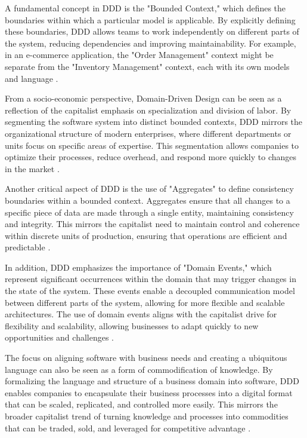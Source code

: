 \begin{refsection}
A fundamental concept in DDD is the "Bounded Context," which defines the boundaries within which a particular model is applicable. By explicitly defining these boundaries, DDD allows teams to work independently on different parts of the system, reducing dependencies and improving maintainability. For example, in an e-commerce application, the "Order Management" context might be separate from the "Inventory Management" context, each with its own models and language \cite[pp.~45-47]{Evans2004}.

From a socio-economic perspective, Domain-Driven Design can be seen as a reflection of the capitalist emphasis on specialization and division of labor. By segmenting the software system into distinct bounded contexts, DDD mirrors the organizational structure of modern enterprises, where different departments or units focus on specific areas of expertise. This segmentation allows companies to optimize their processes, reduce overhead, and respond more quickly to changes in the market \cite[pp.~60-63]{Evans2004}.

Another critical aspect of DDD is the use of "Aggregates" to define consistency boundaries within a bounded context. Aggregates ensure that all changes to a specific piece of data are made through a single entity, maintaining consistency and integrity. This mirrors the capitalist need to maintain control and coherence within discrete units of production, ensuring that operations are efficient and predictable \cite[pp.~84-87]{Evans2004}.

In addition, DDD emphasizes the importance of "Domain Events," which represent significant occurrences within the domain that may trigger changes in the state of the system. These events enable a decoupled communication model between different parts of the system, allowing for more flexible and scalable architectures. The use of domain events aligns with the capitalist drive for flexibility and scalability, allowing businesses to adapt quickly to new opportunities and challenges \cite[pp.~102-105]{Evans2004}.

The focus on aligning software with business needs and creating a ubiquitous language can also be seen as a form of commodification of knowledge. By formalizing the language and structure of a business domain into software, DDD enables companies to encapsulate their business processes into a digital format that can be scaled, replicated, and controlled more easily. This mirrors the broader capitalist trend of turning knowledge and processes into commodities that can be traded, sold, and leveraged for competitive advantage \cite[pp.~120-123]{Evans2004}.


\end{refsection}
